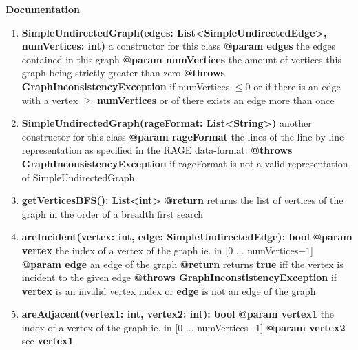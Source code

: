 \documentclass{article}
\begin{document}
	\textbf{Documentation}
	\begin{enumerate}[+]
		\item{
			\textbf{SimpleUndirectedGraph(edges: List<SimpleUndirectedEdge>, numVertices: int)} \newline
			a constructor for this class \newline
			\textbf{@param edges} the edges contained in this graph \newline
			\textbf{@param numVertices} the amount of vertices this graph being strictly greater than zero \newline
			\textbf{@throws GraphInconsistencyException} if numVertices $\leq 0$ or if there is an edge with a vertex $\geq$ \textbf{numVertices} or of there exists an edge more than once
		}
		\item{
			\textbf{SimpleUndirectedGraph(rageFormat: List<String>)} \newline
			another constructor for this class \newline
			\textbf{@param rageFormat} the lines of the line by line representation as specified in the RAGE data-format. \newline
			\textbf{@throws GraphInconsistencyException} if rageFormat is not a valid representation of SimpleUndirectedGraph
		}
		\item{
			\textbf{getVerticesBFS(): List<int>} \newline
			\textbf{@return} returns the list of vertices of the graph in the order of a breadth first search
		}
		\item{
			\textbf{areIncident(vertex: int, edge: SimpleUndirectedEdge): bool} \newline
			\textbf{@param vertex} the index of a vertex of the graph ie. in [0 ... numVertices$-1$]\newline
			\textbf{@param edge} an edge of the graph \newline 
			\textbf{@return} returns \textbf{true} iff the vertex is incident to the given edge \newline
			\textbf{@throws GraphInconstistencyException} if \textbf{vertex} is an invalid vertex index or \textbf{edge} is not an edge of the graph
		}
		\item{
			\textbf{areAdjacent(vertex1: int, vertex2: int): bool} \newline
			\textbf{@param vertex1} the index of a vertex of the graph ie. in [0 ... numVertices$-1$] \newline
			\textbf{@param vertex2} see \textbf{vertex1} \newline
}
\end{enumerate}
\end{document}
